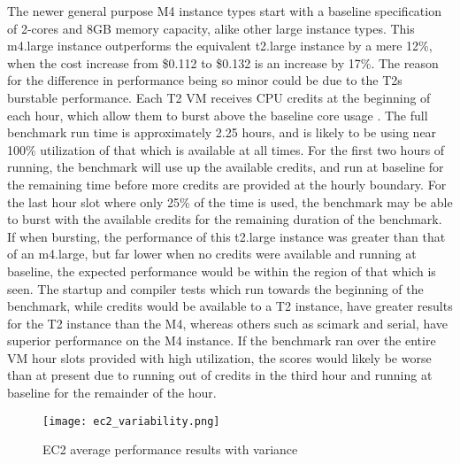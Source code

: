 \documentclass{llncs}
\begin{document}
The newer general purpose M4 instance types start with a baseline specification of 2-cores and 8GB memory capacity, alike other large instance types. This m4.large instance outperforms the equivalent t2.large instance by a mere 12\%, when the cost increase from \$0.112 to \$0.132 is an increase by 17\%. The reason for the difference in performance being so minor could be due to the T2s burstable performance. Each T2 VM receives CPU credits at the beginning of each hour, which allow them to burst above the baseline core usage \cite{awsvmtype}. The full benchmark run time is approximately 2.25 hours, and is likely to be using near 100\% utilization of that which is available at all times. For the first two hours of running, the benchmark will use up the available credits, and run at baseline for the remaining time before more credits are provided at the hourly boundary. For the last hour slot where only 25\% of the time is used, the benchmark may be able to burst with the available credits for the remaining duration of the benchmark. If when bursting, the performance of this t2.large instance was greater than that of an m4.large, but far lower when no credits were available and running at baseline, the expected performance would be within the region of that which is seen. The startup and compiler tests which run towards the beginning of the benchmark, while credits would be available to a T2 instance, have greater results for the T2 instance than the M4, whereas others such as scimark and serial, have superior performance on the M4 instance. If the benchmark ran over the entire VM hour slots provided with high utilization, the scores would likely be worse than at present due to running out of credits in the third hour and running at baseline for the remainder of the hour.


\begin{figure}[ht]
  \centering
  \texttt{[image: ec2\_variability.png]}
  \caption{EC2 average performance results with variance}
  \label{fig:ec2variability}
\end{figure}
\end{document}
